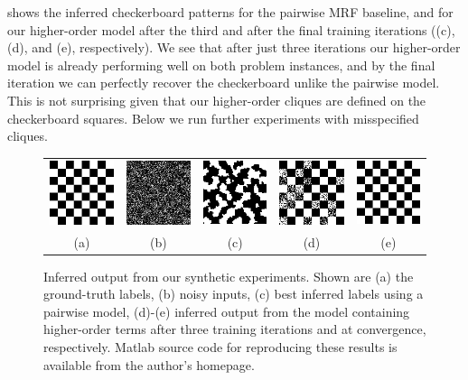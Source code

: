 \documentclass[10pt,journal,letterpaper,compsoc]{IEEEtran}
\begin{document}
 shows the inferred checkerboard
patterns for the pairwise MRF baseline, and for our higher-order model
after the third and after the final training iterations ((c), (d), and
(e), respectively). We see that after just three iterations our
higher-order model is already performing well on both problem
instances, and by the final iteration we can perfectly recover the
checkerboard unlike the pairwise model. This is not surprising given
that our higher-order cliques are defined on the checkerboard
squares. Below we run further experiments with misspecified cliques.

\begin{figure}[t]
  \centering
  \setlength{\tabcolsep}{2pt}
  \begin{tabular}{c|c|c|cc}
    \includegraphics[width=0.18\linewidth]{figures/synthetic/groundtruth} &
    \includegraphics[width=0.18\linewidth]{figures/synthetic/data} &
    \includegraphics[width=0.18\linewidth]{figures/synthetic/pairwise} &
    \includegraphics[width=0.18\linewidth]{figures/synthetic/iteration3} &
    \includegraphics[width=0.18\linewidth]{figures/synthetic/highorder} \\
    {\small (a)} & {\small (b)} &
    {\small (c)} & {\small (d)} &
    {\small (e)}
  \end{tabular}
  \caption{\label{fig:synthetic_results} Inferred output from our
    synthetic experiments. Shown are (a) the ground-truth labels, (b)
    noisy inputs, (c) best inferred labels using a pairwise model,
    (d)-(e) inferred output from the model containing higher-order
    terms after three training iterations and at convergence,
    respectively. Matlab source code for reproducing these results is
    available from the author's homepage.}
\end{figure}
\end{document}
